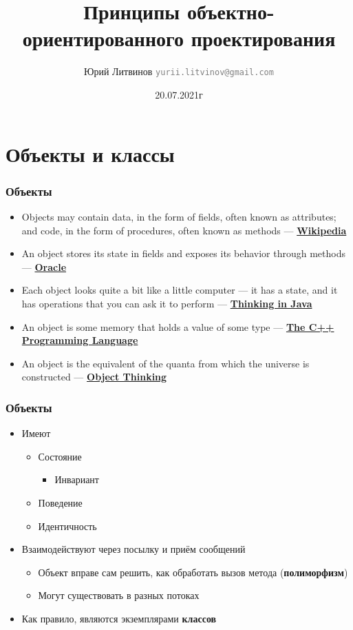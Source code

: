 \documentclass[xetex,mathserif,serif]{beamer}
\title{Принципы объектно-ориентированного проектирования}
\author[Юрий Литвинов]{Юрий Литвинов \newline \textcolor{gray}{\small\texttt{yurii.litvinov@gmail.com}}}
\date{20.07.2021г}
\begin{document}
    
    \frame{\titlepage}

    \section{Объекты и классы}

    \begin{frame}
        \frametitle{Объекты}
        \begin{itemize}
            \item Objects may contain data, in the form of fields, often known as attributes; and code, in the form of procedures, often known as methods --- \textbf{\href{https://en.wikipedia.org/wiki/Object-oriented\_programming}{Wikipedia}}
            \item An object stores its state in fields and exposes its behavior through methods --- \textbf{\href{https://docs.oracle.com/javase/tutorial/java/concepts/object.html}{Oracle}}
            \item Each object looks quite a bit like a little computer --- it has a state, and it has operations that you can ask it to perform --- \textbf{\href{http://amzn.to/1PBmQpm}{Thinking in Java}}
            \item An object is some memory that holds a value of some type --- \textbf{\href{http://amzn.to/1XyGCtk}{The C++ Programming Language}}
            \item An object is the equivalent of the quanta from which the universe is constructed --- \textbf{\href{http://amzn.to/266oJr4}{Object Thinking}}
        \end{itemize}
    \end{frame}

    \begin{frame}
        \frametitle{Объекты}
        \begin{itemize}
            \item Имеют
            \begin{itemize}
                \item Состояние
                \begin{itemize}
                    \item Инвариант
                \end{itemize}
                \item Поведение
                \item Идентичность
            \end{itemize}
            \item Взаимодействуют через посылку и приём сообщений
            \begin{itemize}
                \item Объект вправе сам решить, как обработать вызов метода (\textbf{полиморфизм})
                \item Могут существовать в разных потоках
            \end{itemize}
            \item Как правило, являются экземплярами \textbf{классов}
        \end{itemize}
    \end{frame}
\end{document}
